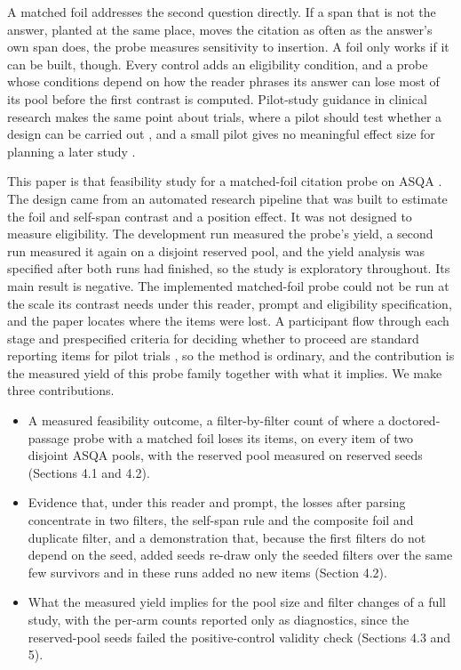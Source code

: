 \documentclass[11pt]{article}
\begin{document}
A matched foil addresses the second question directly. If a span that is not the answer, planted at the same place, moves the citation as often as the answer's own span does, the probe measures sensitivity to insertion. A foil only works if it can be built, though. Every control adds an eligibility condition, and a probe whose conditions depend on how the reader phrases its answer can lose most of its pool before the first contrast is computed. Pilot-study guidance in clinical research makes the same point about trials, where a pilot should test whether a design can be carried out \citep{thabane2010tutorial}, and a small pilot gives no meaningful effect size for planning a later study \citep{leon2011role}.

This paper is that feasibility study for a matched-foil citation probe on ASQA \citep{stelmakh2022asqa}. The design came from an automated research pipeline that was built to estimate the foil and self-span contrast and a position effect. It was not designed to measure eligibility. The development run measured the probe's yield, a second run measured it again on a disjoint reserved pool, and the yield analysis was specified after both runs had finished, so the study is exploratory throughout. Its main result is negative. The implemented matched-foil probe could not be run at the scale its contrast needs under this reader, prompt and eligibility specification, and the paper locates where the items were lost. A participant flow through each stage and prespecified criteria for deciding whether to proceed are standard reporting items for pilot trials \citep{eldridge2016consort}, so the method is ordinary, and the contribution is the measured yield of this probe family together with what it implies. We make three contributions.

\begin{itemize}
\item
  A measured feasibility outcome, a filter-by-filter count of where a doctored-passage probe with a matched foil loses its items, on every item of two disjoint ASQA pools, with the reserved pool measured on reserved seeds (Sections 4.1 and 4.2).
\item
  Evidence that, under this reader and prompt, the losses after parsing concentrate in two filters, the self-span rule and the composite foil and duplicate filter, and a demonstration that, because the first filters do not depend on the seed, added seeds re-draw only the seeded filters over the same few survivors and in these runs added no new items (Section 4.2).
\item
  What the measured yield implies for the pool size and filter changes of a full study, with the per-arm counts reported only as diagnostics, since the reserved-pool seeds failed the positive-control validity check (Sections 4.3 and 5).
\end{itemize}
\end{document}
